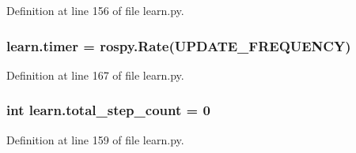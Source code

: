 Definition at line 156 of file learn.\+py.

\subsubsection[{\texorpdfstring{timer}{timer}}]{\setlength{\rightskip}{0pt plus 5cm}learn.\+timer = rospy.\+Rate(U\+P\+D\+A\+T\+E\+\_\+\+F\+R\+E\+Q\+U\+E\+N\+CY)}\hypertarget{namespacelearn_a5af012dac7493e3547f6f8a4820dfc69}{}\label{namespacelearn_a5af012dac7493e3547f6f8a4820dfc69}


Definition at line 167 of file learn.\+py.

\subsubsection[{\texorpdfstring{total\+\_\+step\+\_\+count}{total_step_count}}]{\setlength{\rightskip}{0pt plus 5cm}int learn.\+total\+\_\+step\+\_\+count = 0}\hypertarget{namespacelearn_a3e9002d722506447b145dcdf6fdc3abe}{}\label{namespacelearn_a3e9002d722506447b145dcdf6fdc3abe}


Definition at line 159 of file learn.\+py.

